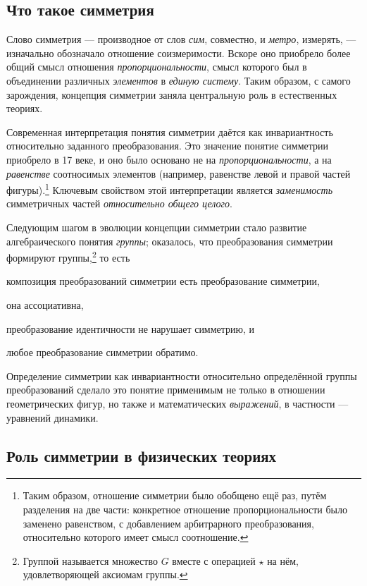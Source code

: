 \documentclass[14pt]{extarticle}
\begin{document}
\subsection{Что такое симметрия}

Слово симметрия --- производное от слов \emph{сим}, совместно, и \emph{метро}, измерять, --- изначально обозначало отношение соизмеримости. Вскоре оно приобрело более общий смысл отношения \emph{пропорциональности}, смысл которого был в объединении различных \emph{элементов} в \emph{единую систему}. Таким образом, с самого зарождения, концепция симметрии заняла центральную роль в естественных теориях.~\cite{SEP.Symmetry}

Современная интерпретация понятия симметрии даётся как инвариантность относительно заданного преобразования. Это значение понятие симметрии приобрело в 17 веке, и оно было основано не на \emph{пропорциональности}, а на \emph{равенстве} соотносимых элементов (например, равенстве левой и правой частей фигуры).\footnote{Таким образом, отношение симметрии было обобщено ещё раз, путём разделения на две части: конкретное отношение пропорциональности было заменено равенством, с добавлением арбитрарного преобразования, относительно которого имеет смысл соотношение.} Ключевым свойством этой интерпретации является \emph{заменимость} симметричных частей \emph{относительно общего целого}.

Следующим шагом в эволюции концепции симметрии стало развитие алгебраического понятия \emph{группы}; оказалось, что преобразования симметрии формируют группы,\footnote{Группой называется множество $G$ вместе с операцией $\star$ на нём, удовлетворяющей аксиомам группы.} то есть 
\begin{inparaenum}[(1)]
	\item композиция преобразований симметрии есть преобразование симметрии,
	\item она ассоциативна,
	\item преобразование идентичности не нарушает симметрию, и
	\item любое преобразование симметрии обратимо.
\end{inparaenum}

Определение симметрии как инвариантности относительно определённой группы преобразований сделало это понятие применимым не только в отношении геометрических фигур, но также и математических \emph{выражений}, в частности --- уравнений динамики.~\cite{SEP.Symmetry}

\subsection{Роль симметрии в физических теориях}
\end{document}

